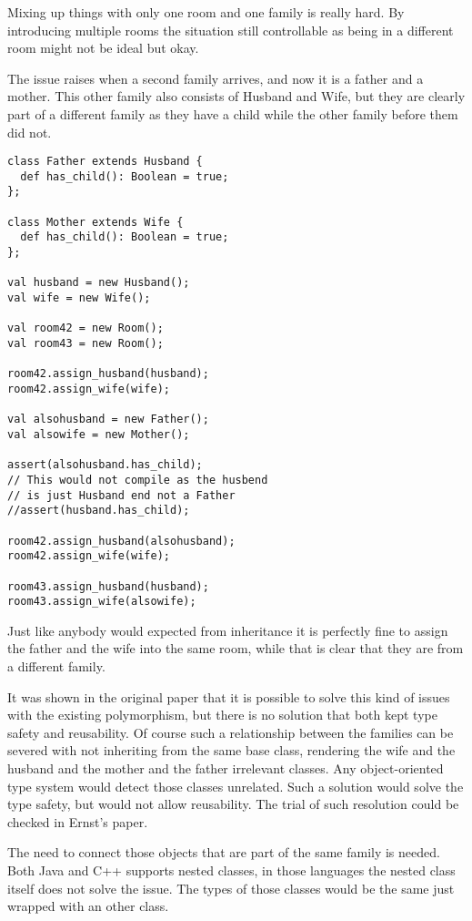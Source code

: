 \documentclass[a4paper, 10pt, conference ]{llncs}
\let\cite\parencite
\begin{document}
Mixing up things with only one room and one family is really hard. By introducing multiple rooms the situation still controllable as being in a different room might not be ideal but okay.

The issue raises when a second family arrives, and now it is a father and a mother. This other family also consists of Husband and Wife, but they are clearly part of a different family as they have a child while the other family before them did not.
\begin{verbatim}
class Father extends Husband {
  def has_child(): Boolean = true;
};

class Mother extends Wife {
  def has_child(): Boolean = true;
};

val husband = new Husband();
val wife = new Wife();

val room42 = new Room();
val room43 = new Room();

room42.assign_husband(husband);
room42.assign_wife(wife);

val alsohusband = new Father();
val alsowife = new Mother();

assert(alsohusband.has_child);
// This would not compile as the husbend
// is just Husband end not a Father
//assert(husband.has_child);

room42.assign_husband(alsohusband);
room42.assign_wife(wife);

room43.assign_husband(husband);
room43.assign_wife(alsowife);
\end{verbatim}

Just like anybody would expected from inheritance it is perfectly fine to assign the father and the wife into the same room, while that is clear that they are from a different family.

It was shown in the original paper that it is possible to solve this kind of issues with the existing polymorphism, but there is no solution that both kept type safety and reusability. 
Of course such a relationship between the families can be severed with not inheriting from the same base class, rendering the wife and the husband and the mother and the father irrelevant classes. Any object-oriented type system would detect those classes unrelated. Such a solution would solve the type safety, but would not allow reusability.
The trial of such resolution could be checked in Ernst's paper\cite{ernst2001family}.


The need to connect those objects that are part of the same family is needed. Both Java and C++ supports nested classes, in those languages the nested class itself does not solve the issue. The types of those classes would be the same just wrapped with an other class.
\end{document}
